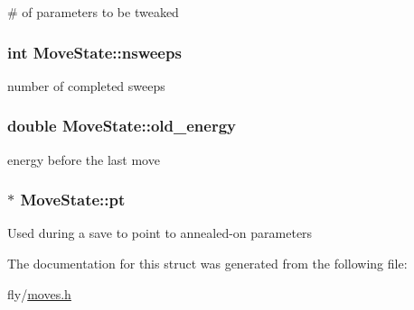 \label{structMoveState_a22129990f5089434d62c9f7dbede353c}
\# of parameters to be tweaked \hypertarget{structMoveState_a4f90403ee79669e85a6334b704f791b9}{
\subsubsection[{nsweeps}]{\setlength{\rightskip}{0pt plus 5cm}int {\bf MoveState::nsweeps}}}
\label{structMoveState_a4f90403ee79669e85a6334b704f791b9}
number of completed sweeps \hypertarget{structMoveState_a8822217e1bf2b4231318e2bf3b2c7d3b}{
\subsubsection[{old\_\-energy}]{\setlength{\rightskip}{0pt plus 5cm}double {\bf MoveState::old\_\-energy}}}
\label{structMoveState_a8822217e1bf2b4231318e2bf3b2c7d3b}
energy before the last move \hypertarget{structMoveState_af721df96a567be5b998d9e6c1cdddbfb}{
\subsubsection[{pt}]{$\ast$ {\bf MoveState::pt}}}
\label{structMoveState_af721df96a567be5b998d9e6c1cdddbfb}
Used during a save to point to annealed-\/on parameters 

The documentation for this struct was generated from the following file:\begin{DoxyCompactItemize}
\item 
fly/\hyperlink{moves_8h}{moves.h}\end{DoxyCompactItemize}
